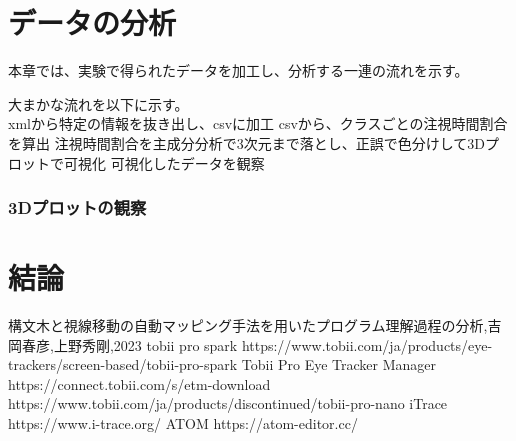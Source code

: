 \documentclass[paper=a4paper,fontsize=10pt]{jlreq}
\begin{document}
\part{データの分析}
  本章では、実験で得られたデータを加工し、分析する一連の流れを示す。
  
  大まかな流れを以下に示す。\\
  xmlから特定の情報を抜き出し、csvに加工
  csvから、クラスごとの注視時間割合を算出
  注視時間割合を主成分分析で3次元まで落とし、正誤で色分けして3Dプロットで可視化
  可視化したデータを観察

  \section{}
    

  \section{3Dプロットの観察}
    

\part{結論}


\begin{thebibliography}{99}
   構文木と視線移動の自動マッピング手法を用いたプログラム理解過程の分析,吉岡春彦,上野秀剛,2023
   tobii pro spark https://www.tobii.com/ja/products/eye-trackers/screen-based/tobii-pro-spark
   Tobii Pro Eye Tracker Manager https://connect.tobii.com/s/etm-download
   https://www.tobii.com/ja/products/discontinued/tobii-pro-nano
   iTrace https://www.i-trace.org/
   ATOM https://atom-editor.cc/
\end{thebibliography}
\end{document}
